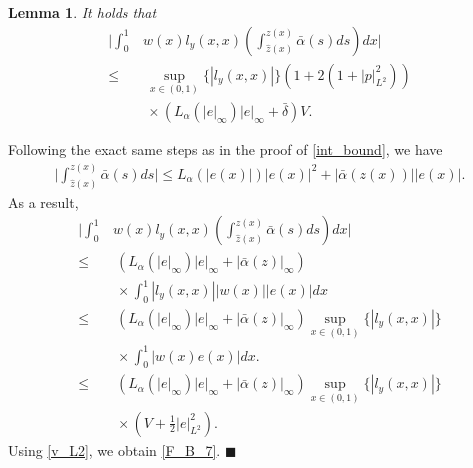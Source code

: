 \documentclass[twocolumn]{autart}
\newtheorem{lemm}{Lemma}
\newenvironment{lemma}{\begin{lemm}}{\hfill \end{lemm}}
\newenvironment{proof}{{\it Proof. }}{\hfill $\blacksquare$ }
\begin{document}
\begin{lemma}
It holds that 
\begin{align}
\bigg| \int_{0}^{1}&w(x)l_y(x,x)\left(\int_{\hat{z}(x)}^{z(x)}\bar{\alpha}(s)ds\right)dx\bigg| \nonumber\\
\leq&~ \sup_{x\in (0,1)}\{|l_y(x,x)|\}\left(1+2\left(1+|p|_{L^2}^2\right)\right) \nonumber \\
&~\times \left(L_{\alpha}(|e|_{\infty}) |e|_{\infty}+\bar{\delta}\right)V. \label{F_B_7}
\end{align}
\hfill  
\end{lemma}
\begin{proof}
Following the exact same steps as in the proof of \eqref{int_bound}, we have 
\begin{align}
\bigg| \int_{\hat{z}(x)}^{z(x)}\bar{\alpha}(s)ds\bigg| \leq L_{\alpha}(|e(x)|) |e(x)|^2+|\bar{\alpha}(z(x))||e(x)|. \label{int_bound2}
\end{align}
As a result,
\begin{align}
\bigg| \int_{0}^{1}&w(x)l_y(x,x)\left(\int_{\hat{z}(x)}^{z(x)}\bar{\alpha}(s)ds\right)dx\bigg| \nonumber\\
\leq&~ \left(L_{\alpha}(|e|_{\infty}) |e|_{\infty}+|\bar{\alpha}(z)|_{\infty}\right) \nonumber \\
&~\times \int_{0}^{1}|l_y(x,x)||w(x)||e(x)|dx \nonumber \\
\leq&~ \left(L_{\alpha}(|e|_{\infty}) |e|_{\infty}+|\bar{\alpha}(z)|_{\infty}\right)\sup_{x\in (0,1)}\{|l_y(x,x)|\}  \nonumber \\
&~\times \int_{0}^{1}|w(x)e(x)|dx.\nonumber \\
\leq&~ \left(L_{\alpha}(|e|_{\infty}) |e|_{\infty}+|\bar{\alpha}(z)|_{\infty}\right)\sup_{x\in (0,1)}\{|l_y(x,x)|\} \nonumber \\
&~\times \left( V+\frac{1}{2}|e|_{L^2}^2\right). \nonumber
\end{align}
Using \eqref{v_L2}, we obtain \eqref{F_B_7}. 
\end{proof}
\end{document}
